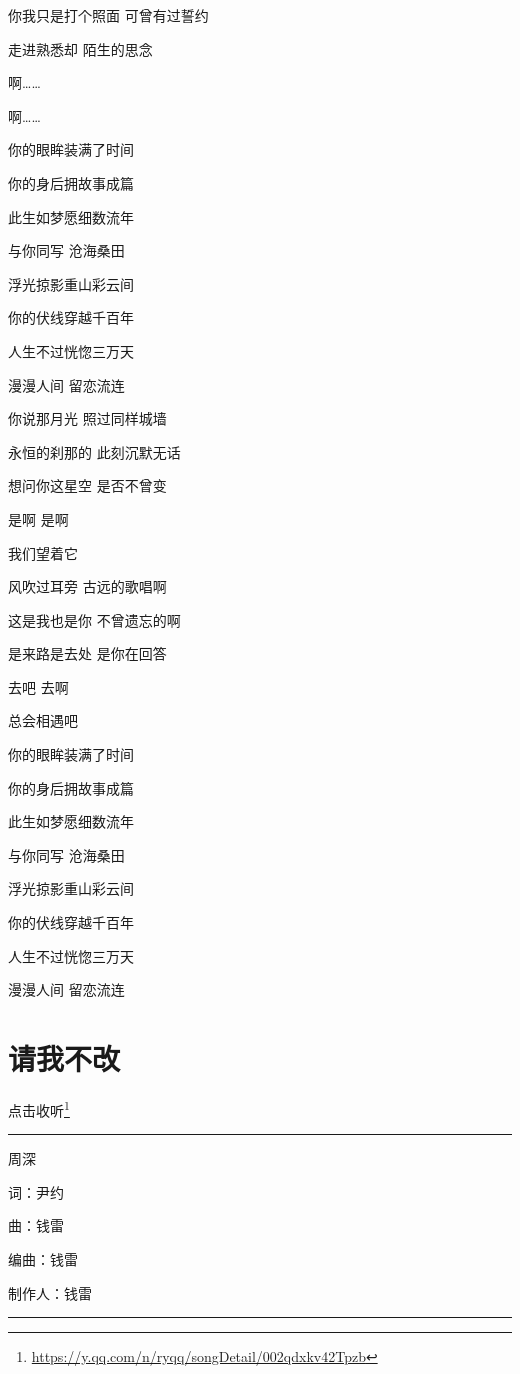 \documentclass[]{ctexbook}
\renewcommand{\href}[2]{#2\footnote{\url{#1}}}
\begin{document}
你我只是打个照面 可曾有过誓约

走进熟悉却 陌生的思念

啊\ldots\ldots{}

啊\ldots\ldots{}

你的眼眸装满了时间

你的身后拥故事成篇

此生如梦愿细数流年

与你同写 沧海桑田

浮光掠影重山彩云间

你的伏线穿越千百年

人生不过恍惚三万天

漫漫人间 留恋流连

你说那月光 照过同样城墙

永恒的刹那的 此刻沉默无话

想问你这星空 是否不曾变

是啊 是啊

我们望着它

风吹过耳旁 古远的歌唱啊

这是我也是你 不曾遗忘的啊

是来路是去处 是你在回答

去吧 去啊

总会相遇吧

你的眼眸装满了时间

你的身后拥故事成篇

此生如梦愿细数流年

与你同写 沧海桑田

浮光掠影重山彩云间

你的伏线穿越千百年

人生不过恍惚三万天

漫漫人间 留恋流连

\section*{请我不改}\label{brave-heart}


\href{https://y.qq.com/n/ryqq/songDetail/002qdxkv42Tpzb}{点击收听}

\begin{center}\rule{0.5\linewidth}{0.5pt}\end{center}

周深

词：尹约

曲：钱雷

编曲：钱雷

制作人：钱雷

\begin{center}\rule{0.5\linewidth}{0.5pt}\end{center}
\end{document}
